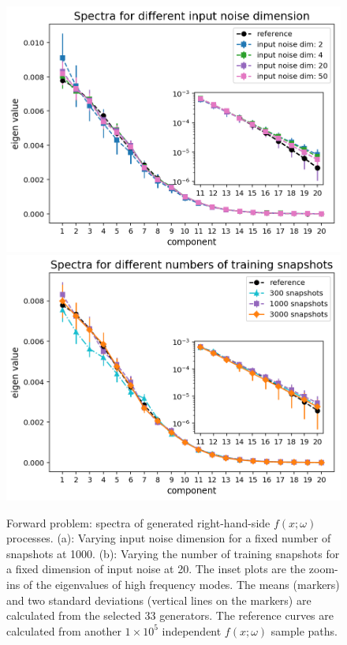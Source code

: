 \documentclass[conference,compsoc]{IEEEtran}
\begin{document}
\begin{figure}
    \centering
    \includegraphics[scale=0.4]{figures/1_EigenValue_4.png}	
    \label{fig:1_PCA_1}
    \includegraphics[scale=0.4]{figures/1_EigenValue_5.png}
    \label{fig:1_PCA_2}
	\caption{Forward problem: spectra of generated right-hand-side $f(x;\omega)$ processes. (a): Varying input noise dimension for a fixed number of snapshots at 1000. (b): Varying the number of training snapshots for a fixed dimension of input noise at 20. The inset plots are the zoom-ins of the eigenvalues of high frequency modes.  The means (markers) and two standard deviations (vertical lines on the markers) are calculated from the selected 33 generators. The reference curves are calculated from another $1\times 10^5$ independent $f(x;\omega)$ sample paths.\cite{yang2018physics}}
\end{figure}
\end{document}

